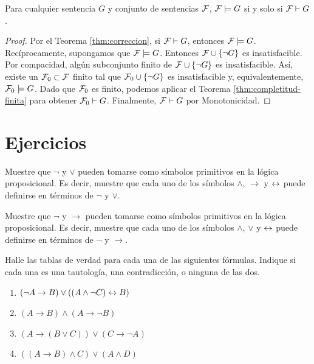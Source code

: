 \message{ !name(main.tex)}\documentclass[12pt,a4paper]{book}
\begin{document}
    \begin{teorema}\label{thm:completitud}
        Para cualquier sentencia $G$ y conjunto de sentencias $\mathcal{F}$, $\mathcal{F}\models G$ si y solo si $\mathcal{F}\vdash G$.
    \end{teorema}
    \begin{proof}
        Por el Teorema \ref{thm:correccion}, si $\mathcal{F}\vdash G$, entonces $\mathcal{F}\models G$.\\
        Recíprocamente, supongamos que $\mathcal{F}\models G$. Entonces $\mathcal{F}\cup\{\neg G\}$ es insatisfacible. Por compacidad,
        algún subconjunto finito de $\mathcal{F}\cup\{\neg G\}$ es insatisfacible. Así, existe un $\mathcal{F}_{0}\subset\mathcal{F}$ finito tal
        que $\mathcal{F}_{0}\cup\{\neg G\}$ es insatisfacible y, equivalentemente, $\mathcal{F}_{0}\models G$. Dado que $\mathcal{F}_{0}$ es finito,
        podemos aplicar el Teorema \ref{thm:completitud-finita} para obtener $\mathcal{F}_{0}\vdash G$. Finalmente,
        $\mathcal{F}\vdash G$ por Monotonicidad.
    \end{proof}

    \section*{Ejercicios}

    \begin{ejercicio}
        Muestre que $\neg$ y $\vee$ pueden tomarse como símbolos primitivos en la lógica proposicional. Es decir, muestre
        que cada uno de los símbolos $\wedge$, $\rightarrow$ y $\leftrightarrow$ puede definirse en términos de $\neg$ y $\vee$.
    \end{ejercicio}

    \begin{ejercicio}
        Muestre que $\neg$ y $\rightarrow$ pueden tomarse como símbolos primitivos en la lógica proposicional. Es decir,
        muestre que cada uno de los símbolos $\wedge$, $\vee$ y $\leftrightarrow$ puede definirse en términos de $\neg$ y $\rightarrow$.
    \end{ejercicio}

    \begin{ejercicio}\label{ej:tablas-verdad-varias}
        Halle las tablas de verdad para cada una de las siguientes fórmulas. Indique si cada una es una tautología, una
        contradicción, o ninguna de las dos.
        \begin{enumerate}[label=(\alph*)]
            \item $(\neg A\rightarrow B)\vee((A\wedge\neg C)\leftrightarrow B)$
            \item $(A\rightarrow B)\wedge(A\rightarrow\neg B)$
            \item $(A\rightarrow(B\vee C))\vee(C\rightarrow\neg A)$
            \item $((A\rightarrow B)\wedge C)\vee(A\wedge D)$
        \end{enumerate}
    \end{ejercicio}
\end{document}
